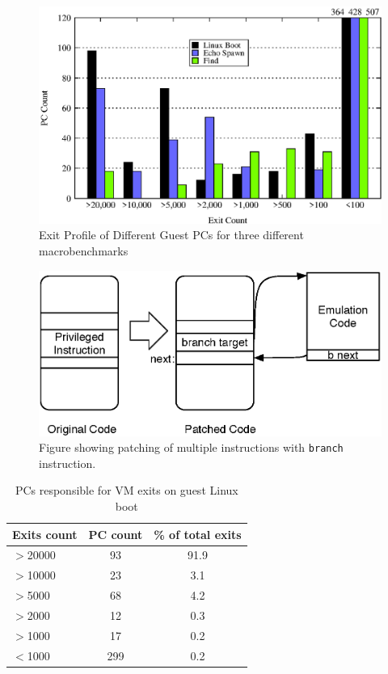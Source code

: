 \documentclass[10pt,twocolumn]{article}
\begin{document}
\begin{figure}[!htb]
\centering

\includegraphics[scale=0.5]{pc_count.eps}
\caption{Exit Profile of Different Guest PCs for three different macrobenchmarks}
\label{fig:pc_profile}
\end{figure}

\begin{figure}[!htb]
\centering

\includegraphics[scale=0.5]{txcache.eps}
\caption{Figure showing patching of multiple instructions with {\tt branch} instruction.}
\label{fig:txcache}
\end{figure}


\begin{table}[!b]
\centering
     \begin{tabular}{lcc} \hline
       Exits count  & PC count & \% of total exits  \\ \hline
       $>$20000 & 93 & 91.9  \\
       $>$10000 & 23 & 3.1  \\
       $>$5000 & 68 & 4.2  \\
       $>$2000 & 12 & 0.3 \\
       $>$1000 & 17 & 0.2 \\
       $<$1000 & 299 & 0.2 \\
       \hline
     \end{tabular}
\label{tab:linuxboot_pcexits}
\caption{PCs responsible for VM exits on guest Linux boot}
\end{table}
\end{document}
